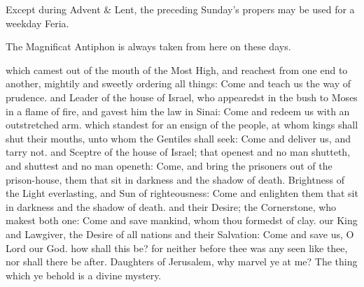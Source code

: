 {}

\begin{secrubric}
	Except during Advent \& Lent, the preceding Sunday's propers may be used for a weekday Feria.
\end{secrubric}



\begin{rubric}
    The Magnificat Antiphon is always taken from here on these days.
\end{rubric}
\begin{multicols}{2}
 {\dag} which camest out of the mouth of the Most High, and reachest from one end to another, mightily and sweetly ordering all things: Come and teach us the way of prudence.
 {\dag} and Leader of the house of Israel, who appearedst in the bush to Moses in a flame of fire, and gavest him the law in Sinai: Come and redeem us with an outstretched arm.
 {\dag} which standest for an ensign of the people, at whom kings shall shut their mouths, unto whom the Gentiles shall seek: Come and deliver us, and tarry not.
 {\dag} and Sceptre of the house of Israel; that openest and no man shutteth, and shuttest and no man openeth: Come, and bring the prisoners out of the prison-house, them that sit in darkness and the shadow of death.
 {\dag} Brightness of the Light everlasting, and Sun of righteousness: Come and enlighten them that sit in darkness and the shadow of death.
 {\dag} and their Desire; the Cornerstone, who makest both one: Come and save mankind, whom thou formedst of clay.
 {\dag} our King and Lawgiver, the Desire of all nations and their Salvation: Come and save us, O Lord our God.
 {\dag} how shall this be? for neither before thee was any seen like thee, nor shall there be after. Daughters of Jerusalem, why marvel ye at me? The thing which ye behold is a divine mystery.
\end{multicols}


